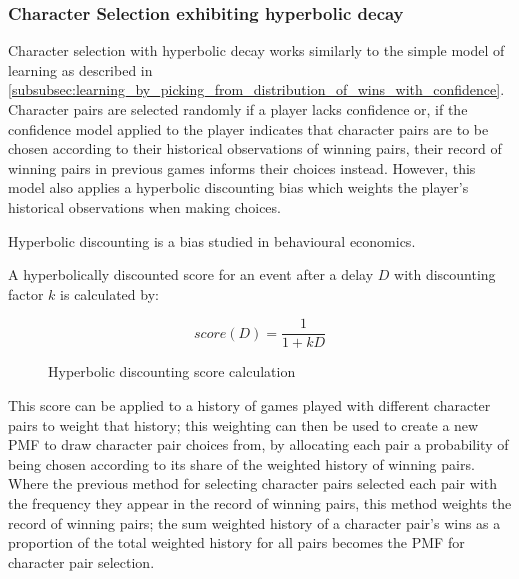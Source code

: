 \subsubsection{Character Selection exhibiting hyperbolic decay}\label{subsubsec:learning_with_hyperbolic_decay}

Character selection with hyperbolic decay works similarly to the simple model of learning
as described in \cref{subsubsec:learning_by_picking_from_distribution_of_wins_with_confidence}.
Character pairs are selected randomly if a player lacks confidence or, if the confidence model applied
to the player indicates that character pairs are to be chosen according to their historical observations of
winning pairs, their record of winning pairs in previous games informs their choices instead. However,
this model also applies a hyperbolic discounting bias which weights the player's historical observations
when making choices.

Hyperbolic discounting is a bias studied in behavioural economics.

A hyperbolically discounted score for an event after a delay \(D\) with discounting factor \(k\) is
calculated by:

\begin{figure}
\[score(D) = \frac{1}{1 + kD}\]
\caption{Hyperbolic discounting score calculation}
\end{figure}

This score can be applied to a history of games played with different character pairs to weight that history;
this weighting can then be used to create a new PMF to draw character pair choices from, by allocating each pair
a probability of being chosen according to its share of the weighted history of winning pairs.
Where the previous method for selecting character pairs selected each pair with the frequency they appear
in the record of winning pairs, this method weights the record of winning pairs; the sum weighted history of
a character pair's wins as a proportion of the total weighted history for all pairs
becomes the PMF for character pair selection.

